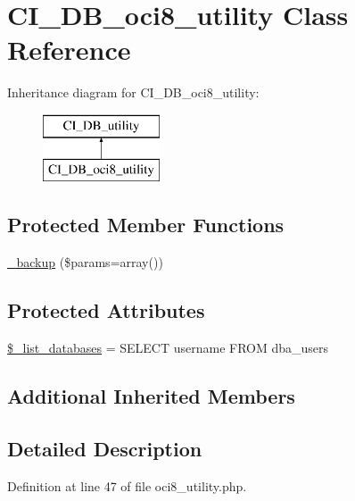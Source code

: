 \hypertarget{class_c_i___d_b__oci8__utility}{}\section{C\+I\+\_\+\+D\+B\+\_\+oci8\+\_\+utility Class Reference}
\label{class_c_i___d_b__oci8__utility}
Inheritance diagram for C\+I\+\_\+\+D\+B\+\_\+oci8\+\_\+utility\+:\begin{figure}[H]
\begin{center}
\leavevmode
\includegraphics[height=2.000000cm]{class_c_i___d_b__oci8__utility}
\end{center}
\end{figure}
\subsection*{Protected Member Functions}
\begin{DoxyCompactItemize}
\item 
\mbox{\hyperlink{class_c_i___d_b__oci8__utility_a30f3053d2c82e7562349924363507afa}{\+\_\+backup}} (\$params=array())
\end{DoxyCompactItemize}
\subsection*{Protected Attributes}
\begin{DoxyCompactItemize}
\item 
\mbox{\hyperlink{class_c_i___d_b__oci8__utility_afe3a5b80562d93d6bc7e2b53c95b7e5a}{\$\+\_\+list\+\_\+databases}} = \textquotesingle{}S\+E\+L\+E\+CT username F\+R\+OM dba\+\_\+users\textquotesingle{}
\end{DoxyCompactItemize}
\subsection*{Additional Inherited Members}


\subsection{Detailed Description}


Definition at line 47 of file oci8\+\_\+utility.\+php.



